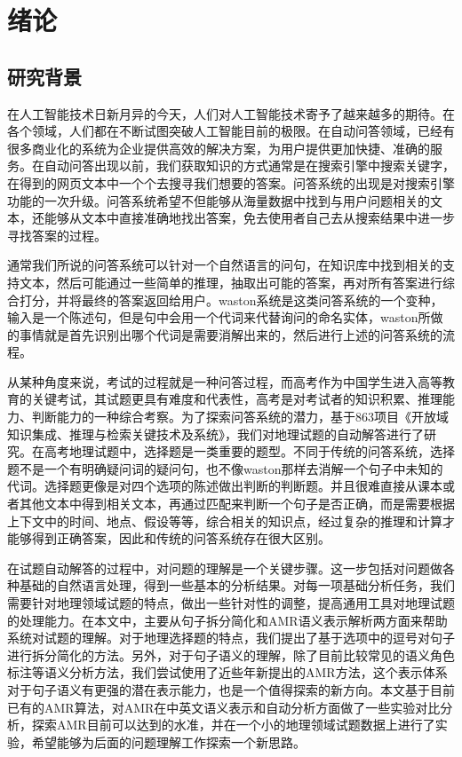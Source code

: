 \documentclass[master, winfont]{njuthesis}
\begin{document}
\listoftables

\mainmatter

\chapter{绪论}\label{chapter_introduction}
\section{研究背景}
在人工智能技术日新月异的今天，人们对人工智能技术寄予了越来越多的期待。在各个领域，人们都在不断试图突破人工智能目前的极限。在自动问答领域，已经有很多商业化的系统为企业提供高效的解决方案，为用户提供更加快捷、准确的服务。在自动问答出现以前，我们获取知识的方式通常是在搜索引擎中搜索关键字，在得到的网页文本中一个个去搜寻我们想要的答案。问答系统的出现是对搜索引擎功能的一次升级。问答系统希望不但能够从海量数据中找到与用户问题相关的文本，还能够从文本中直接准确地找出答案，免去使用者自己去从搜索结果中进一步寻找答案的过程。

通常我们所说的问答系统可以针对一个自然语言的问句，在知识库中找到相关的支持文本，然后可能通过一些简单的推理，抽取出可能的答案，再对所有答案进行综合打分，并将最终的答案返回给用户。waston系统是这类问答系统的一个变种，输入是一个陈述句，但是句中会用一个代词来代替询问的命名实体，waston所做的事情就是首先识别出哪个代词是需要消解出来的，然后进行上述的问答系统的流程\cite{Ferrucci2010}。

从某种角度来说，考试的过程就是一种问答过程，而高考作为中国学生进入高等教育的关键考试，其试题更具有难度和代表性，高考是对考试者的知识积累、推理能力、判断能力的一种综合考察。为了探索问答系统的潜力，基于863项目《开放域知识集成、推理与检索关键技术及系统》，我们对地理试题的自动解答进行了研究。在高考地理试题中，选择题是一类重要的题型。不同于传统的问答系统，选择题不是一个有明确疑问词的疑问句，也不像waston那样去消解一个句子中未知的代词。选择题更像是对四个选项的陈述做出判断的判断题。并且很难直接从课本或者其他文本中得到相关文本，再通过匹配来判断一个句子是否正确，而是需要根据上下文中的时间、地点、假设等等，综合相关的知识点，经过复杂的推理和计算才能够得到正确答案，因此和传统的问答系统存在很大区别。

在试题自动解答的过程中，对问题的理解是一个关键步骤。这一步包括对问题做各种基础的自然语言处理，得到一些基本的分析结果。对每一项基础分析任务，我们需要针对地理领域试题的特点，做出一些针对性的调整，提高通用工具对地理试题的处理能力。在本文中，主要从句子拆分简化和AMR语义表示解析两方面来帮助系统对试题的理解。对于地理选择题的特点，我们提出了基于选项中的逗号对句子进行拆分简化的方法。另外，对于句子语义的理解，除了目前比较常见的语义角色标注等语义分析方法，我们尝试使用了近些年新提出的AMR方法，这个表示体系对于句子语义有更强的潜在表示能力，也是一个值得探索的新方向。本文基于目前已有的AMR算法，对AMR在中英文语义表示和自动分析方面做了一些实验对比分析，探索AMR目前可以达到的水准，并在一个小的地理领域试题数据上进行了实验，希望能够为后面的问题理解工作探索一个新思路。
\end{document}
